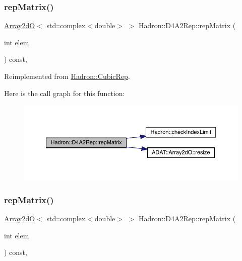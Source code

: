\subsubsection{\texorpdfstring{repMatrix()}{repMatrix()}\hspace{0.1cm}{\footnotesize\ttfamily [1/2]}}
{\footnotesize\ttfamily \mbox{\hyperlink{classADAT_1_1Array2dO}{Array2dO}}$<$ std\+::complex$<$double$>$ $>$ Hadron\+::\+D4\+A2\+Rep\+::rep\+Matrix (\begin{DoxyParamCaption}\item[{int}]{elem }\end{DoxyParamCaption}) const\hspace{0.3cm}{\ttfamily [inline]}, {\ttfamily [virtual]}}



Reimplemented from \mbox{\hyperlink{structHadron_1_1CubicRep_ac5d7e9e6f4ab1158b5fce3e4ad9e8005}{Hadron\+::\+Cubic\+Rep}}.

Here is the call graph for this function\+:
\nopagebreak
\begin{figure}[H]
\begin{center}
\leavevmode
\includegraphics[width=350pt]{d7/d66/structHadron_1_1D4A2Rep_a278dadc5305417dfc7dd7a8e1ae642d4_cgraph}
\end{center}
\end{figure}
\mbox{\label{structHadron_1_1D4A2Rep_a278dadc5305417dfc7dd7a8e1ae642d4}} 
\subsubsection{\texorpdfstring{repMatrix()}{repMatrix()}\hspace{0.1cm}{\footnotesize\ttfamily [2/2]}}
{\footnotesize\ttfamily \mbox{\hyperlink{classADAT_1_1Array2dO}{Array2dO}}$<$ std\+::complex$<$double$>$ $>$ Hadron\+::\+D4\+A2\+Rep\+::rep\+Matrix (\begin{DoxyParamCaption}\item[{int}]{elem }\end{DoxyParamCaption}) const\hspace{0.3cm}{\ttfamily [inline]}, {\ttfamily [virtual]}}



